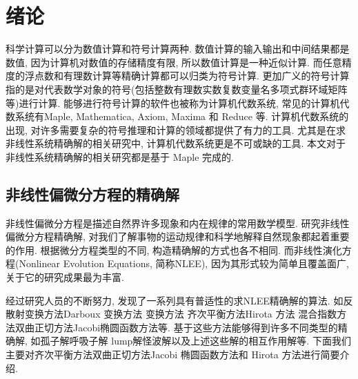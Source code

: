 \chapter{绪论} \label{ch01}
科学计算可以分为数值计算和符号计算两种. 数值计算的输入输出和中间结果都是数值, 因为计算机对数值的存储精度有限, 所以数值计算是一种近似计算. 而任意精度的浮点数和有理数计算等精确计算都可以归类为符号计算. 更加广义的符号计算指的是对代表数学对象的符号(包括整数\D 有理数\D 实数\D 复数\D 变量名\D 多项式\D 群\D 环\D 域\D 矩阵等)进行计算. 能够进行符号计算的软件也被称为计算机代数系统, 常见的计算机代数系统有Maple, Mathematica, Axiom, Maxima 和 Reduce 等. 计算机代数系统的出现, 对许多需要复杂的符号推理和计算的领域都提供了有力的工具. 尤其是在求非线性系统精确解的相关研究中, 计算机代数系统更是不可或缺的工具. 本文对于非线性系统精确解的相关研究都是基于 Maple 完成的. 

\section{非线性偏微分方程的精确解}
非线性偏微分方程是描述自然界许多现象和内在规律的常用数学模型. 研究非线性偏微分方程精确解, 对我们了解事物的运动规律和科学地解释自然现象都起着重要的作用. 根据微分方程类型的不同, 构造精确解的方式也各不相同. 而非线性演化方程(Nonlinear Evolution Equations, 简称NLEE), 因为其形式较为简单且覆盖面广, 关于它的研究成果最为丰富. 

经过研究人员的不断努力, 发现了一系列具有普适性的求NLEE精确解的算法. 如反散射变换方法\cite{kawata1978inverse,ma2014verifying}\D Darboux 变换方法 \cite{matveev1991darboux,ling2018general,lou1997non}\D \Backlund{}变换方法 \cite{wahlquist1973backlund,li2007method,cheng2015multiple}\D 齐次平衡方法\cite{zhibin1993travelling,wang1995solitary,wang1996application,hbm1998,hbm1998b,hbm1999,senthilvelan2001extended,zhao2002new,feng2004comment,nguyen2015modified,rady2010homogeneous,eslami2014exact}\D Hirota 方法 \cite{hirota1971exact,hereman1991exact,hu2002application,hirota2003vector,ma2015lump}\D 混合指数方法\cite{hereman1986exact}\D 双曲正切方法\cite{huang1989exact,malfliet1992solitary,li_book_2007,parkes1996automated,liu2001master,li2002rath,fan2000extended,yan2001new,zheng2003generalized}\D Jacobi椭圆函数方法\cite{liu2001jacobi,zhang2003jacobi,zhou2003periodic,yin2002automated,yin2003automated,li2004raeem,chen2003improved,wang2005new,gui2005applications,chao2005symbolic}等. 基于这些方法能够得到许多不同类型的精确解, 如孤子解\cite{hirota1971exact,makhankov1980computer}\D 呼吸子解 \cite{tajiri1989breather,guo2011rogue,sun2018general}\D lump解\cite{satsuma1979two,villarroel1999discrete,imai1997dromion}\D 怪波解\cite{guo2011rogue,zhang2014rogue,sun2018general,zhaqilao2018symbolic}以及上述这些解的相互作用解等. 下面我们主要对齐次平衡方法\D 双曲正切方法\D Jacobi 椭圆函数方法和 Hirota 方法进行简要介绍. 


